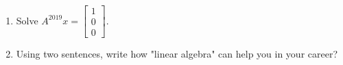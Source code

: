 \documentclass[11pt]{amsart}
\begin{document}
\begin{enumerate}
\item Solve $A^{2019} x = \begin{bmatrix}
1 \\
0\\
0
\end{bmatrix}$.

\vspace{.5in}\vspace{.5in}
\vspace{.5in}\vspace{.5in}
\vspace{.5in}\vspace{.5in}
\vspace{.5in}\vspace{.5in}



\item Using two sentences, write how "linear algebra" can help you in your career? 




\end{enumerate}
\end{document}
